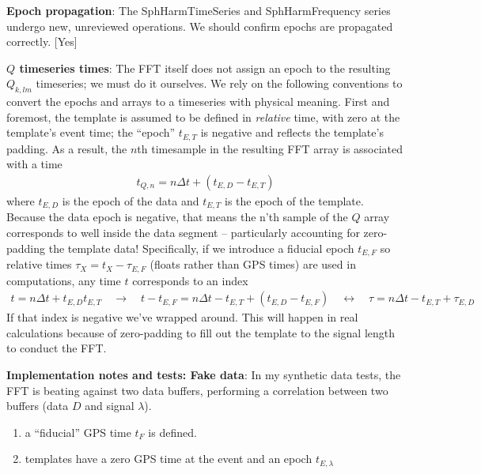 \documentclass[twocolumn,prd,nofootinbib]{revtex4}
\begin{document}
\begin{widetext}
\begin{widetext}
\noindent \textbf{Epoch propagation}: The SphHarmTimeSeries and SphHarmFrequency series undergo new, unreviewed
operations.  We should confirm epochs are propagated correctly.  [Yes]

\noindent \textbf{$Q$ timeseries times}: The FFT itself does not assign an epoch to the resulting $Q_{k,lm}$
timeseries; we must do it ourselves.  
%
We rely on the following conventions to convert the epochs and arrays to a timeseries with physical meaning.  
%
First and foremost,  the template is assumed to be defined in
\emph{relative} time, with zero at the template's event time; the ``epoch'' $t_{E,T}$ is negative and reflects the
template's padding.  As a result, the $n$th timesample in the resulting FFT array is associated with a time
\begin{eqnarray}
t_{Q,n} = n \Delta t + (t_{E,D} - t_{E,T})
\end{eqnarray}
where $t_{E,D}$ is the epoch of the data and $t_{E,T}$ is the epoch of the template.  
%
Because the data epoch is negative, that means the n'th sample of the $Q$ array corresponds to  well inside the data
segment -- particularly accounting for zero-padding the template data!    Specifically, if we introduce a fiducial epoch
$t_{E,F}$ so relative times  $\tau_X =t_X - \tau_{E,F}$ (floats rather than GPS times) are used in computations, any time $t$ corresponds to an index
\begin{eqnarray}
t=n\Delta t + t_{E,D} t_{E,T} \quad \rightarrow \quad
t-t_{E,F} = n \Delta t - t_{E,T} + (t_{E,D}  - t_{E,F}) \quad \leftrightarrow  \quad 
\tau  =  n \Delta t - t_{E,T} + \tau_{E,D}
\end{eqnarray}
If that index is negative we've wrapped around.   This will happen in real calculations because of zero-padding to fill
out the template to the signal length to conduct the FFT.


\noindent \textbf{Implementation notes and tests: Fake data}:
In my synthetic data tests, the FFT is beating against two data buffers, performing a correlation between two buffers (data $D$ and signal $\lambda$).
\begin{enumerate}
\item  a ``fiducial'' GPS time $t_F$ is defined.
\item templates have a zero GPS time at the event and an epoch $t_{E,\lambda}$


\end{enumerate}
\end{widetext}
\end{widetext}
\end{document}
